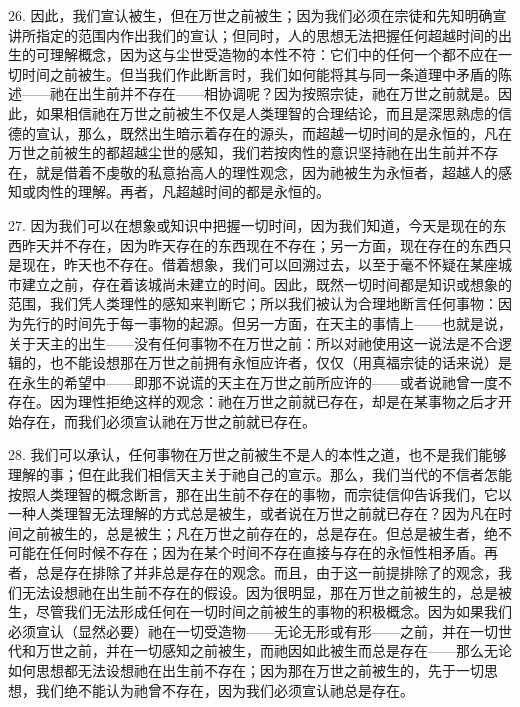 26. 因此，我们宣认被生，但在万世之前被生；因为我们必须在宗徒和先知明确宣讲所指定的范围内作出我们的宣认；但同时，人的思想无法把握任何超越时间的出生的可理解概念，因为这与尘世受造物的本性不符：它们中的任何一个都不应在一切时间之前被生。但当我们作此断言时，我们如何能将其与同一条道理中矛盾的陈述——祂在出生前并不存在——相协调呢？因为按照宗徒，祂在万世之前就是。因此，如果相信祂在万世之前被生不仅是人类理智的合理结论，而且是深思熟虑的信德的宣认，那么，既然出生暗示着存在的源头，而超越一切时间的是永恒的，凡在万世之前被生的都超越尘世的感知，我们若按肉性的意识坚持祂在出生前并不存在，就是借着不虔敬的私意抬高人的理性观念，因为祂被生为永恒者，超越人的感知或肉性的理解。再者，凡超越时间的都是永恒的。\par

27. 因为我们可以在想象或知识中把握一切时间，因为我们知道，今天是现在的东西昨天并不存在，因为昨天存在的东西现在不存在；另一方面，现在存在的东西只是现在，昨天也不存在。借着想象，我们可以回溯过去，以至于毫不怀疑在某座城市建立之前，存在着该城尚未建立的时间。因此，既然一切时间都是知识或想象的范围，我们凭人类理性的感知来判断它；所以我们被认为合理地断言任何事物：因为先行的时间先于每一事物的起源。但另一方面，在天主的事情上——也就是说，关于天主的出生——没有任何事物不在万世之前：所以对祂使用这一说法是不合逻辑的，也不能设想那在万世之前拥有永恒应许者，仅仅（用真福宗徒的话来说）是在永生的希望中——即那不说谎的天主在万世之前所应许的——或者说祂曾一度不存在。因为理性拒绝这样的观念：祂在万世之前就已存在，却是在某事物之后才开始存在，而我们必须宣认祂在万世之前就已存在。\par

28. 我们可以承认，任何事物在万世之前被生不是人的本性之道，也不是我们能够理解的事；但在此我们相信天主关于祂自己的宣示。那么，我们当代的不信者怎能按照人类理智的概念断言，那在出生前不存在的事物，而宗徒信仰告诉我们，它以一种人类理智无法理解的方式总是被生，或者说在万世之前就已存在？因为凡在时间之前被生的，总是被生；凡在万世之前存在的，总是存在。但总是被生者，绝不可能在任何时候不存在；因为在某个时间不存在直接与存在的永恒性相矛盾。再者，总是存在排除了并非总是存在的观念。而且，由于这一前提排除了的观念，我们无法设想祂在出生前不存在的假设。因为很明显，那在万世之前被生的，总是被生，尽管我们无法形成任何在一切时间之前被生的事物的积极概念。因为如果我们必须宣认（显然必要）祂在一切受造物——无论无形或有形——之前，并在一切世代和万世之前，并在一切感知之前被生，而祂因如此被生而总是存在——那么无论如何思想都无法设想祂在出生前不存在；因为那在万世之前被生的，先于一切思想，我们绝不能认为祂曾不存在，因为我们必须宣认祂总是存在。\par

